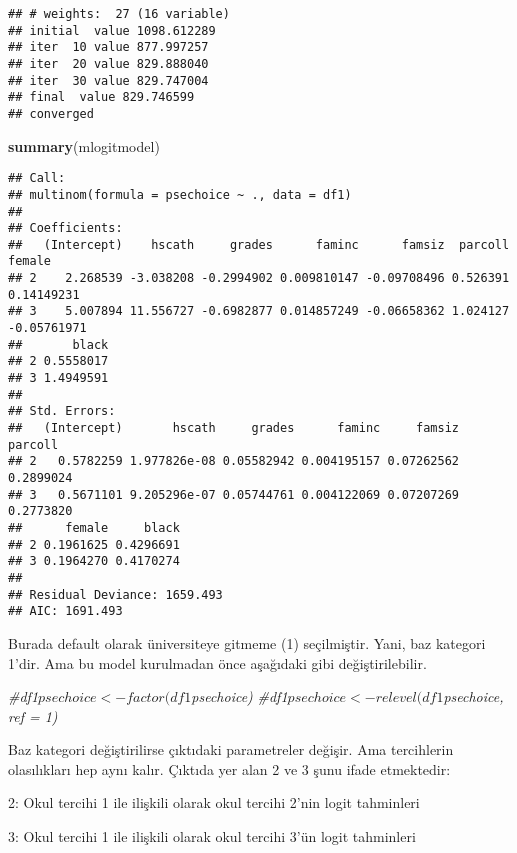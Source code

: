 \documentclass[
]{book}
\newenvironment{Shaded}{\begin{snugshade}}{\end{snugshade}}
\newcommand{\CommentTok}[1]{\textcolor[rgb]{0.56,0.35,0.01}{\textit{#1}}}
\newcommand{\KeywordTok}[1]{\textcolor[rgb]{0.13,0.29,0.53}{\textbf{#1}}}
\newcommand{\NormalTok}[1]{#1}
\begin{document}
\begin{verbatim}
## # weights:  27 (16 variable)
## initial  value 1098.612289 
## iter  10 value 877.997257
## iter  20 value 829.888040
## iter  30 value 829.747004
## final  value 829.746599 
## converged
\end{verbatim}

\begin{Shaded}
\begin{Highlighting}[]
\KeywordTok{summary}\NormalTok{(mlogitmodel)}
\end{Highlighting}
\end{Shaded}

\begin{verbatim}
## Call:
## multinom(formula = psechoice ~ ., data = df1)
## 
## Coefficients:
##   (Intercept)    hscath     grades      faminc      famsiz  parcoll      female
## 2    2.268539 -3.038208 -0.2994902 0.009810147 -0.09708496 0.526391  0.14149231
## 3    5.007894 11.556727 -0.6982877 0.014857249 -0.06658362 1.024127 -0.05761971
##       black
## 2 0.5558017
## 3 1.4949591
## 
## Std. Errors:
##   (Intercept)       hscath     grades      faminc     famsiz   parcoll
## 2   0.5782259 1.977826e-08 0.05582942 0.004195157 0.07262562 0.2899024
## 3   0.5671101 9.205296e-07 0.05744761 0.004122069 0.07207269 0.2773820
##      female     black
## 2 0.1961625 0.4296691
## 3 0.1964270 0.4170274
## 
## Residual Deviance: 1659.493 
## AIC: 1691.493
\end{verbatim}

Burada default olarak üniversiteye gitmeme (1) seçilmiştir. Yani, baz kategori 1'dir. Ama bu model kurulmadan önce aşağıdaki gibi değiştirilebilir.

\begin{Shaded}
\begin{Highlighting}[]
\CommentTok{#df1$psechoice <- factor(df1$psechoice)}
\CommentTok{#df1$psechoice <- relevel(df1$psechoice, ref = 1)}
\end{Highlighting}
\end{Shaded}

Baz kategori değiştirilirse çıktıdaki parametreler değişir. Ama tercihlerin olasılıkları hep aynı kalır. Çıktıda yer alan 2 ve 3 şunu ifade etmektedir:

2: Okul tercihi 1 ile ilişkili olarak okul tercihi 2'nin logit tahminleri

3: Okul tercihi 1 ile ilişkili olarak okul tercihi 3'ün logit tahminleri
\end{document}
